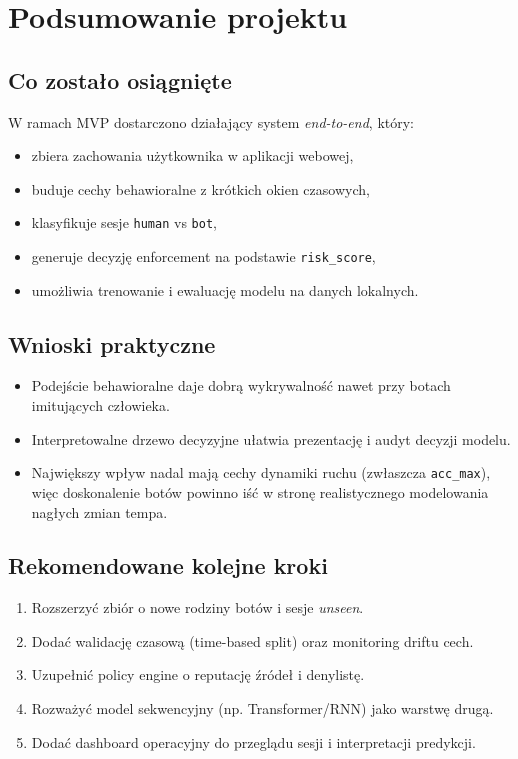 \section{Podsumowanie projektu}

\subsection{Co zostało osiągnięte}
W ramach MVP dostarczono działający system \textit{end-to-end}, który:
\begin{itemize}
  \item zbiera zachowania użytkownika w aplikacji webowej,
  \item buduje cechy behawioralne z krótkich okien czasowych,
  \item klasyfikuje sesje \texttt{human} vs \texttt{bot},
  \item generuje decyzję enforcement na podstawie \texttt{risk\_score},
  \item umożliwia trenowanie i ewaluację modelu na danych lokalnych.
\end{itemize}

\subsection{Wnioski praktyczne}
\begin{itemize}
  \item Podejście behawioralne daje dobrą wykrywalność nawet przy botach imitujących człowieka.
  \item Interpretowalne drzewo decyzyjne ułatwia prezentację i audyt decyzji modelu.
  \item Największy wpływ nadal mają cechy dynamiki ruchu (zwłaszcza \texttt{acc\_max}),
  więc doskonalenie botów powinno iść w stronę realistycznego modelowania nagłych zmian tempa.
\end{itemize}

\subsection{Rekomendowane kolejne kroki}
\begin{enumerate}
  \item Rozszerzyć zbiór o nowe rodziny botów i sesje \textit{unseen}.
  \item Dodać walidację czasową (time-based split) oraz monitoring driftu cech.
  \item Uzupełnić policy engine o reputację źródeł i denylistę.
  \item Rozważyć model sekwencyjny (np. Transformer/RNN) jako warstwę drugą.
  \item Dodać dashboard operacyjny do przeglądu sesji i interpretacji predykcji.
\end{enumerate}
